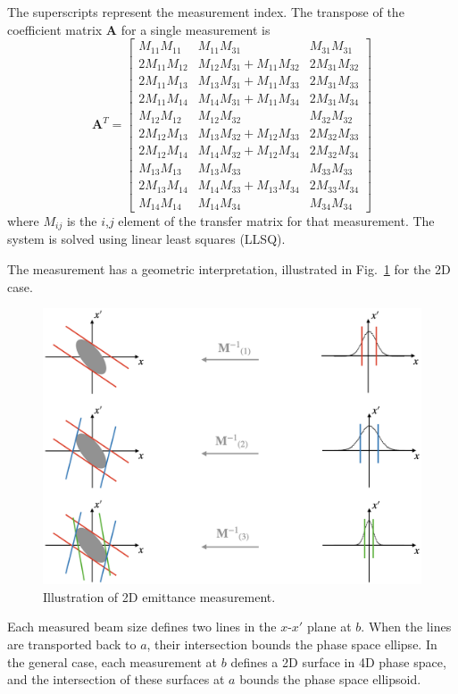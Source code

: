%
The superscripts represent the measurement index. The transpose of the coefficient matrix $\mathbf{A}$ for a single measurement is
%
\begin{equation}
    \mathbf{A}^T = 
    \begin{bmatrix}
        M_{11}M_{11} & M_{11}M_{31} & M_{31}M_{31} \\
        2M_{11}M_{12} & M_{12}M_{31} + M_{11}M_{32} & 2M_{31}M_{32} \\
        2M_{11}M_{13} & M_{13}M_{31} + M_{11}M_{33} & 2M_{31}M_{33} \\
        2M_{11}M_{14} & M_{14}M_{31} + M_{11}M_{34} & 2M_{31}M_{34} \\
        M_{12}M_{12} & M_{12}M_{32} & M_{32}M_{32} \\
        2M_{12}M_{13} & M_{13}M_{32} + M_{12}M_{33} & 2M_{32}M_{33} \\
        2M_{12}M_{14} & M_{14}M_{32} + M_{12}M_{34} & 2M_{32}M_{34} \\
        M_{13}M_{13} & M_{13}M_{33} & M_{33}M_{33} \\
        2M_{13}M_{14} & M_{14}M_{33} + M_{13}M_{34} & 2M_{33}M_{34} \\
        M_{14}M_{14} & M_{14}M_{34} & M_{34}M_{34}
    \end{bmatrix}
\end{equation}
%
where $M_{ij}$ is the $i$,$j$ element of the transfer matrix for that measurement. The system is solved using linear least squares (LLSQ). 

The measurement has a geometric interpretation, illustrated in Fig.~\ref{fig:ws_emittance_measurement} for the 2D case. 
%
\begin{figure}[!p]
    \centering
    \includegraphics[width=\textwidth]{Images/chapter4/ws_emittance_measurement.png}
    \caption{Illustration of 2D emittance measurement.}
    \label{fig:ws_emittance_measurement}
\end{figure}
%
Each measured beam size defines two lines in the $x$-$x'$ plane at $b$. When the lines are transported back to $a$, their intersection bounds the phase space ellipse. In the general case, each measurement at $b$ defines a 2D surface in 4D phase space, and the intersection of these surfaces at $a$ bounds the phase space ellipsoid.


